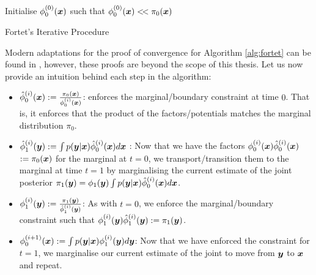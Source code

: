 \documentclass[a4paper,12pt,twoside,openright]{report}
\theoremstyle{definition}
\begin{document}
\begin{algorithm} \label{alg:fortet}
Initialise $\phi_0^{(0)}({\bm{x}})$ such that $\phi_0^{(0)}({\bm{x}}) <\!< \pi_0({\bm{x}})$ \\
\caption{Fortet's Iterative Procedure}
\end{algorithm}
Modern adaptations for the proof of convergence for Algorithm  \ref{alg:fortet} can be found in \citep{essid2019traversing, chen2016entropic}, however, these proofs are beyond the scope of this thesis. Let us now provide an intuition behind each step in the algorithm:

\begin{itemize}
    \item ${\hat{\phi}}_0^{(i)}({\bm{x}}) := \frac{\pi_0({\bm{x}})}{\phi_0^{(i)}({\bm{x}})}$: enforces the marginal/boundary constraint at time $0$. That is, it enforces that the product of the factors/potentials matches the marginal distribution $\pi_0$.
    \item ${\hat{\phi}}_1^{(i)}({\bm{y}}) := \int  p({\bm{y}} | {\bm{x}}) {\hat{\phi}}_0^{(i)}({\bm{x}}) d{\bm{x}}$ : Now that we have the factors $\phi_0^{(i)}({\bm{x}}) {\hat{\phi}}_0^{(i)}({\bm{x}}) $ $:= {\pi_0({\bm{x}})}$ for the marginal at $t=0$, we transport/transition them to the marginal at time $t=1$ by marginalising the current estimate of the joint posterior $\pi_1({\bm{y}}) = \phi_1({\bm{y}}) \int p({\bm{y}}| {\bm{x}}) {\hat{\phi}}_0^{(i)}({\bm{x}}) d{\bm{x}}$.
    \item  $\phi_1^{(i)}({\bm{y}}) := \frac{\pi_1({\bm{y}})}{{\hat{\phi}}_1^{(i)}({\bm{y}})}$: As with $t=0$, we enforce the marginal/boundary  constraint such that  $\phi_1^{(i)}({\bm{y}}) {\hat{\phi}}_1^{(i)}({\bm{y}}) := {\pi_1({\bm{y}})}$. 
    \item $\phi^{(i+1)}_0({\bm{x}}) := \int  p({\bm{y}} | {\bm{x}}) \phi_1^{(i)}({\bm{y}}) d{\bm{y}}$: Now that we have enforced the constraint for $t=1$, we marginalise our current estimate of the joint to move from ${\bm{y}}$ to ${\bm{x}}$ and repeat.
\end{itemize}
\end{document}
